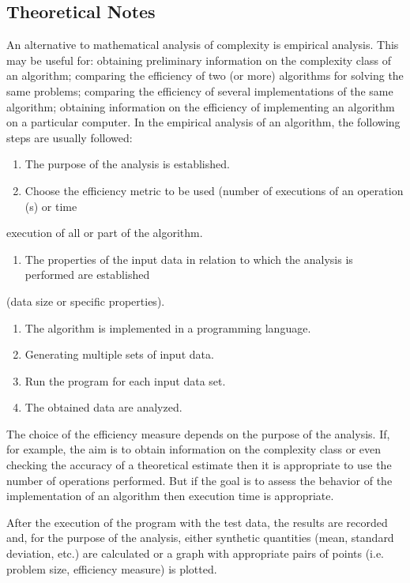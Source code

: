 \documentclass[a4paper,12pt]{article}
\begin{document}
\subsection{Theoretical Notes}
\label{sec:org0a88905}
An alternative to mathematical analysis of complexity is empirical analysis.
This may be useful for: obtaining preliminary information on the complexity class of an
algorithm; comparing the efficiency of two (or more) algorithms for solving the same problems;
comparing the efficiency of several implementations of the same algorithm; obtaining information on the
efficiency of implementing an algorithm on a particular computer.
In the empirical analysis of an algorithm, the following steps are usually followed:
\begin{enumerate}
\item The purpose of the analysis is established.
\item Choose the efficiency metric to be used (number of executions of an operation (s) or time
\end{enumerate}
execution of all or part of the algorithm.
\begin{enumerate}
\item The properties of the input data in relation to which the analysis is performed are established
\end{enumerate}
(data size or specific properties).
\begin{enumerate}
\item The algorithm is implemented in a programming language.
\item Generating multiple sets of input data.
\item Run the program for each input data set.
\item The obtained data are analyzed.
\end{enumerate}

The choice of the efficiency measure depends on the purpose of the analysis. If, for example, the
aim is to obtain information on the complexity class or even checking the accuracy of a theoretical
estimate then it is appropriate to use the number of operations performed. But if the goal is to assess the
behavior of the implementation of an algorithm then execution time is appropriate.

After the execution of the program with the test data, the results are recorded and, for the purpose
of the analysis, either synthetic quantities (mean, standard deviation, etc.) are calculated or a graph with
appropriate pairs of points (i.e. problem size, efficiency measure) is plotted.
\end{document}
